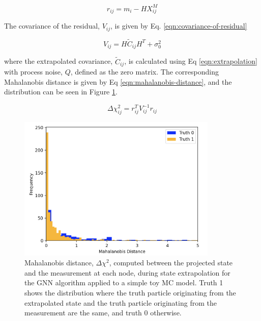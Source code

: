 \begin{equation}
r_{ij} = m_i - HX_{ij}^M
\label{eqn:residual}
\end{equation}

The covariance of the residual, $V_{ij}$, is given by Eq. \eqref{eqn:covariance-of-residual}

\begin{equation}
{V}_{ij} = H \widetilde{C}_{ij} H^{T} + \sigma_{0}^{2}
\label{eqn:covariance-of-residual}
\end{equation}

where the extrapolated covariance, $\widetilde{C}_{ij}$, is calculated using Eq \eqref{eqn:extrapolation} with process noise, $Q$, defined as the zero matrix. The corresponding Mahalanobis distance is given by Eq \eqref{eqn:mahalanobis-distance}, and the distribution can be seen in Figure \ref{fig:mahalanobis-threshold-toy-model}.

\begin{equation}
\Delta \chi_{ij}^{2} = r_{ij}^{T} {V}_{ij}^{-1} r_{ij}
\label{eqn:mahalanobis-distance}
\end{equation}


\begin{figure}[htbp]
    \centering
    \includegraphics[width=0.85\textwidth]{images/5-gnn-algorithm/mahalanobis-threshold-toy-model.png}
    \caption{Mahalanobis distance, $\Delta \chi^{2}$, computed between the projected state and the measurement at each node, during state extrapolation for the GNN algorithm applied to a simple toy MC model. Truth 1 shows the distribution where the truth particle originating from the extrapolated state and the truth particle originating from the measurement are the same, and truth 0 otherwise.}
    \label{fig:mahalanobis-threshold-toy-model}%
\end{figure}



